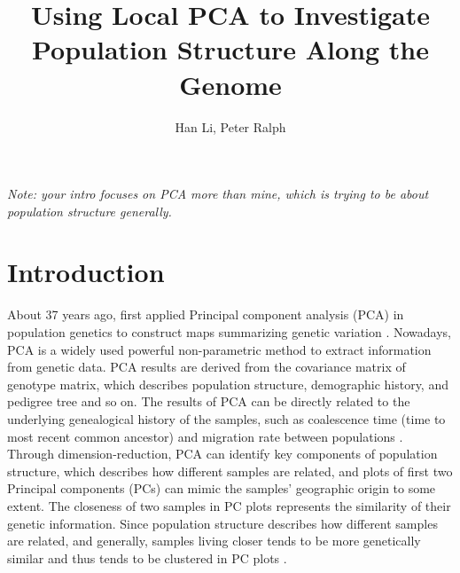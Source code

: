 \documentclass[11pt, oneside]{article}   	%
\title{Using Local PCA to Investigate Population Structure Along the Genome}
\author{Han Li, Peter Ralph}
\newcommand{\plr}[1]{{\em \color{blue} #1}}
\begin{document}
\maketitle
\doublespacing

\plr{Note: your intro focuses on PCA more than mine, which is trying to be about population structure generally.}

\section{Introduction}

About 37 years ago, \citet{menozzi1978synthetic} first applied Principal component analysis (PCA) in population genetics to construct maps summarizing genetic variation \citep{menozzi1978synthetic}. Nowadays, PCA is a widely used powerful non-parametric method to extract information from genetic data. PCA results are derived from the covariance matrix of genotype matrix, which describes population structure, demographic history, and pedigree tree and so on. The results of PCA can be directly related to the underlying genealogical history of the samples, such as coalescence time (time to most recent common ancestor) and migration rate between populations \citep{menozzi1978synthetic,novembre2008interpreting,mcvean2009genealogical}. Through dimension-reduction, PCA can identify key components of population structure, which describes how different samples are related, and plots of first two Principal components (PCs) can mimic the samples' geographic origin to some extent. The closeness of two samples in PC plots represents the similarity of their genetic information. Since population structure describes how different samples are related, and generally, samples living closer tends to be more genetically similar and thus tends to be clustered in PC plots \citep{novembre2008genes,key6}.
 
\end{document}
